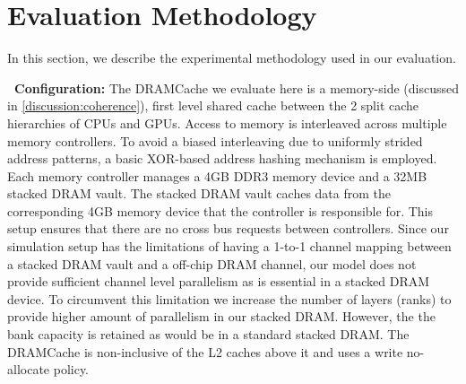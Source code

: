 \section{Evaluation Methodology} \label{methodology}
In this section, we describe the experimental methodology used in our evaluation. 

\par \textbf{\cachename\ Configuration:} The DRAMCache we evaluate here is a memory-side (discussed in \ref{discussion:coherence}),
first level shared cache between the 2 split cache hierarchies of CPUs and GPUs. Access to memory is interleaved across multiple memory controllers. To avoid a biased interleaving due to uniformly strided address patterns, a basic XOR-based address hashing mechanism is employed. Each memory controller manages a 4GB DDR3 memory device and a 32MB stacked DRAM vault. The stacked DRAM vault caches data from the corresponding 4GB memory device that the controller is responsible for. This setup ensures that there are no cross bus requests between controllers. Since our simulation setup has the limitations of having a 1-to-1 channel mapping between a stacked DRAM vault and a off-chip DRAM channel, our model does not provide sufficient channel level parallelism as is essential in a stacked DRAM device. To circumvent this limitation we increase the number of layers (ranks) to provide higher amount of parallelism in our stacked DRAM. However, the the bank capacity is retained as would be in a standard stacked DRAM. The DRAMCache is non-inclusive  \cite{coherence-dramcache} of the L2 caches above it and uses a write no-allocate policy.

